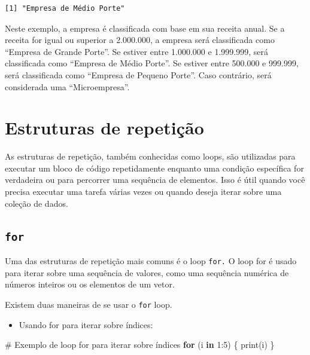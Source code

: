 \documentclass[
  portuguese,
  letterpaper,
  DIV=11,
  numbers=noendperiod]{scrreprt}
\newenvironment{Shaded}{\begin{snugshade}}{\end{snugshade}}
\newcommand{\CommentTok}[1]{\textcolor[rgb]{0.37,0.37,0.37}{#1}}
\newcommand{\ControlFlowTok}[1]{\textcolor[rgb]{0.00,0.23,0.31}{\textbf{#1}}}
\newcommand{\DecValTok}[1]{\textcolor[rgb]{0.68,0.00,0.00}{#1}}
\newcommand{\FunctionTok}[1]{\textcolor[rgb]{0.28,0.35,0.67}{#1}}
\newcommand{\NormalTok}[1]{\textcolor[rgb]{0.00,0.23,0.31}{#1}}
\newcommand{\SpecialCharTok}[1]{\textcolor[rgb]{0.37,0.37,0.37}{#1}}
\providecommand{\tightlist}{%
  \setlength{\itemsep}{0pt}\setlength{\parskip}{0pt}}
\theoremstyle{definition}
\theoremstyle{remark}
\begin{document}
\begin{verbatim}
[1] "Empresa de Médio Porte"
\end{verbatim}

Neste exemplo, a empresa é classificada com base em sua receita anual.
Se a receita for igual ou superior a 2.000.000, a empresa será
classificada como ``Empresa de Grande Porte''. Se estiver entre
1.000.000 e 1.999.999, será classificada como ``Empresa de Médio
Porte''. Se estiver entre 500.000 e 999.999, será classificada como
``Empresa de Pequeno Porte''. Caso contrário, será considerada uma
``Microempresa''.

\section{Estruturas de repetição}\label{estruturas-de-repetiuxe7uxe3o}

As estruturas de repetição, também conhecidas como loops, são utilizadas
para executar um bloco de código repetidamente enquanto uma condição
específica for verdadeira ou para percorrer uma sequência de elementos.
Isso é útil quando você precisa executar uma tarefa várias vezes ou
quando deseja iterar sobre uma coleção de dados.

\subsection{\texorpdfstring{\texttt{for}}{for}}\label{sec-fluxos-for}

Uma das estruturas de repetição mais comuns é o loop \texttt{for.} O
loop for é usado para iterar sobre uma sequência de valores, como uma
sequência numérica de números inteiros ou os elementos de um vetor.

Existem duas maneiras de se usar o \texttt{for} loop.

\begin{itemize}
\tightlist
\item
  Usando for para iterar sobre índices:
\end{itemize}

\begin{Shaded}
\begin{Highlighting}[]
\CommentTok{\# Exemplo de loop for para iterar sobre índices}
\ControlFlowTok{for}\NormalTok{ (i }\ControlFlowTok{in} \DecValTok{1}\SpecialCharTok{:}\DecValTok{5}\NormalTok{) \{}
  \FunctionTok{print}\NormalTok{(i)}
\NormalTok{\}}
\end{Highlighting}
\end{Shaded}
\end{document}
